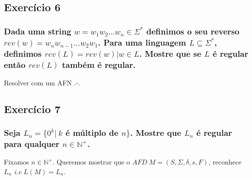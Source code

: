 \documentclass{article}
\begin{document}
\subsection*{Exercício 6}
\subsubsection*{Dada uma string $w = w_1w_2\dots w_n \in \Sigma^\ast$ definimos o seu reverso $rev(w) = w_{n}w_{n-1}\dots w_2w_1$. Para uma linguagem $L \subseteq \Sigma^\ast$, definimos $rev(L) = {rev(w) | w \in L}$. Mostre que se $L$ é regular então $rev(L)$ também é regular.}

Resolver com um AFN .-.

\subsection*{Exercício 7}
\subsubsection*{Seja $L_n = \{0^k | \ k $ é múltiplo de $n \}$. Mostre que $L_n$ é regular para qualquer $n \in \mathbb{N}^+$.}

Fixamos $n \in \mathbb{N}^+$. Queremos mostrar que o $AFD \ M = (S,\Sigma,\delta,s,F)$, reconhece $L_n$ \textit{i.e} $L(M) = L_n$.

\begin{center}
\end{center}
\end{document}
